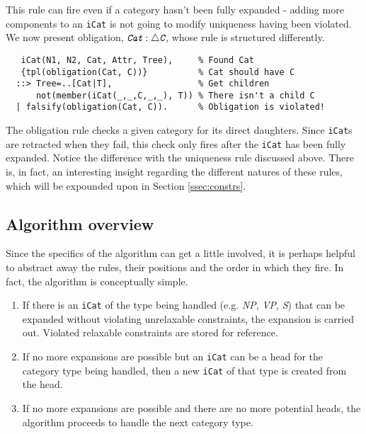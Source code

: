 \documentclass{llncs}
\newcommand{\obligation}[2]{\textit{#1} : \triangle \textit{#2}}
\newcommand{\NP}{\textit{NP}\xspace}
\newcommand{\VP}{\textit{VP}\xspace}
\newcommand{\Se}{\textit{S}\xspace}
\begin{document}
This rule can fire even if a category hasn't been fully expanded - adding more components to an \texttt{iCat} is not going to modify uniqueness having been violated. We now present obligation, $\obligation{\texttt{Cat}}{\texttt{C}}$, whose rule is structured differently.

\begin{verbatim}
   iCat(N1, N2, Cat, Attr, Tree),     % Found Cat
   {tpl(obligation(Cat, C))}          % Cat should have C
  ::> Tree=..[Cat|T],                 % Get children
      not(member(iCat(_,_,C,_,_), T)) % There isn't a child C
  | falsify(obligation(Cat, C)).      % Obligation is violated!
\end{verbatim}

The obligation rule checks a given category for its direct daughters. Since \texttt{iCat}s are retracted when they fail, this check only fires after the \texttt{iCat} has been fully expanded. Notice the difference with the uniqueness rule discussed above. There is, in fact, an interesting insight regarding the different natures of these rules, which will be expounded upon in Section \ref{ssec:constrs}.

\subsection{Algorithm overview}

Since the specifics of the algorithm can get a little involved, it is perhaps helpful to abstract away the rules, their positions and the order in which they fire. In fact, the algorithm is conceptually simple.

\begin{enumerate}
\item If there is an \texttt{iCat} of the type being handled (e.g. \NP, \VP, \Se) that can be expanded without violating unrelaxable constraints, the expansion is carried out. Violated relaxable constraints are stored for reference.
\item If no more expansions are possible but an \texttt{iCat} can be a head for the category type being handled, then a new \texttt{iCat} of that type is created from the head.
\item If no more expansions are possible and there are no more potential heads, the algorithm proceeds to handle the next category type.
\end{enumerate}
\end{document}

